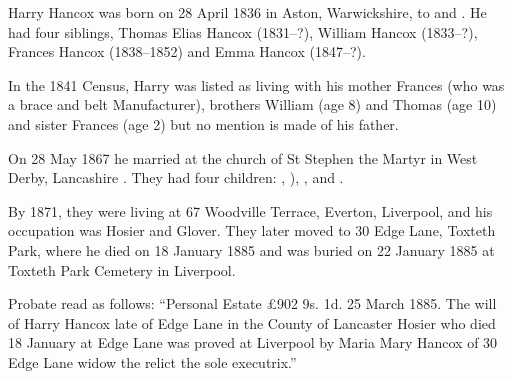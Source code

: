 
Harry Hancox was born on 28 April 1836 in Aston, Warwickshire, to  and .
He had four siblings, Thomas Elias Hancox (1831--?), William Hancox (1833--?), Frances Hancox (1838--1852) and Emma Hancox (1847--?). 

In the 1841 Census, Harry was listed as living with his mother Frances (who was a brace and belt Manufacturer), brothers William (age 8) and Thomas (age 10) and sister Frances (age 2) but no mention is made of his father. \cite{HarryHancoxBirth}

On 28 May 1867 he married  at the church of St Stephen the Martyr in West Derby, Lancashire \cite{HarryHancoxMarriage}.  They had four children: , ), , and .

By 1871, they were living at 67 Woodville Terrace, Everton, Liverpool, and his occupation was Hosier and Glover.\cite{HarryHancoxOccupation}  They later moved to 30 Edge Lane, Toxteth Park, where he died on 18 January 1885 \cite{HarryHancoxDeath} and was buried on 22 January 1885 at Toxteth Park Cemetery in Liverpool.\cite{HHGravestone}

Probate read as follows: ``Personal Estate \pounds 902 9s. 1d. 25 March 1885. The will of Harry Hancox late of Edge Lane in the County of Lancaster Hosier who died 18 January at Edge Lane was proved at Liverpool by Maria Mary Hancox of 30 Edge Lane widow the relict the sole executrix.''
